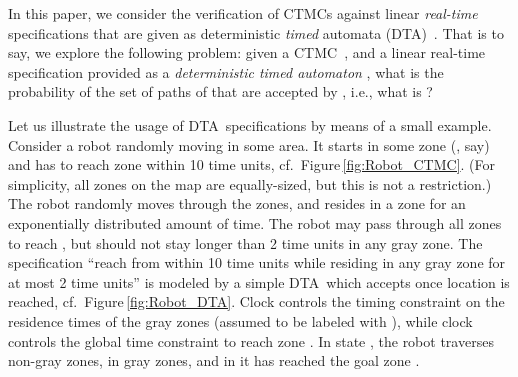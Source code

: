 \documentclass{LMCS}
\newcommand{\<}{\langle}
\renewcommand{\>}{\rangle}
\newcommand{\CTMC}{\textsc{{CTMC}}}
\newcommand{\DTA}{\textsc{DTA}}
\begin{document}
In this paper, we consider the verification of CTMCs against linear \emph{real-time}
specifications that are given as deterministic \emph{timed} automata (DTA)~\cite{AD94}.
That is to say, we explore the following problem: given a \CTMC\ , and a
linear real-time specification provided as a \emph{deterministic timed automaton}
, what is the probability of the set of paths of  that are accepted
by , i.e., what is ?

\begin{exa}
Let us illustrate the usage of \DTA\ specifications by means of a small example.
Consider a robot randomly moving in some area. It starts in some zone (, say)
and has to reach zone  within 10 time units, cf.\ Figure\,\ref{fig:Robot_CTMC}.
(For simplicity, all zones on the map are equally-sized, but this is not a restriction.)
The robot randomly moves through the zones, and resides in a zone for an
exponentially distributed amount of time.
The robot may pass through all zones to reach , but should not stay longer
than 2 time units in any gray zone.
The specification ``reach  from  within 10 time units while residing in any
gray zone for at most 2 time units'' is modeled by a simple \DTA\ which accepts
once location  is reached, cf.\ Figure\,\ref{fig:Robot_DTA}.
Clock  controls the timing constraint on the residence times of the gray zones
(assumed to be labeled with ), while clock  controls the global time constraint
to reach zone .
In state , the robot traverses non-gray zones, in  gray zones, and in
 it has reached the goal zone .
\begin{figure}[h]
\begin{center}
\hspace{-0.7cm}
\end{center}
\end{figure}
\end{exa}
\end{document}
